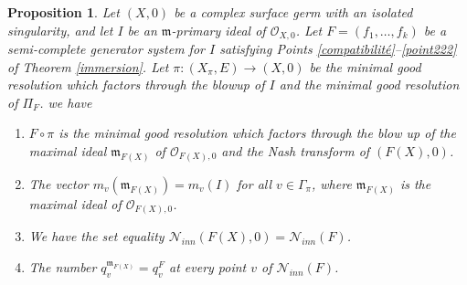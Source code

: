 \documentclass[reqno,dvipsnames,12pt]{amsart}
\newtheorem{prop}[thm]{Proposition}
\begin{document}
\begin{prop}\label{geometricdecompositionarethesame}
  Let $(X,0)$ be a complex surface germ with an isolated singularity, and let $I$ be an $\mathfrak{m}$-primary ideal of $\mathcal{O}_{X,0}$. Let $F=(f_1,\dots,f_k)$ be a semi-complete generator system for $I$ satisfying Points \ref{compatibilité}--\ref{point222} of Theorem \ref{immersion}. Let $\pi:(X_{\pi},E) \longrightarrow (X,0)$ be the minimal good resolution  which factors through the blowup of $I$ and the minimal good resolution of $\Pi_F$.  we have

\begin{enumerate}
	\item  $F \circ \pi$ is the minimal good resolution which factors through the blow up of the maximal ideal $\mathfrak{m}_{F(X)}$ of $\mathcal{O}_{F(X),0}$ and the Nash transform of $(F(X),0)$. \label{merde1}
	\item The vector $m_v(\mathfrak{m}_{F(X)})=m_v(I)$ for all $v \in \Gamma_{\pi}$, where $\mathfrak{m}_{F(X)}$ is the maximal ideal of $\mathcal{O}_{F(X),0}$.\label{merde2}
	\item We have the set equality $\mathcal{N}_{inn}(F(X),0)= \mathcal{N}_{inn}(F)$.\label{merde3}
	\item The number $q_v^{\mathfrak{m}_{F(X)}}=q_v^{F}$ at every point $v$ of 	$\mathcal{N}_{inn}(F)$.	\label{merde4}
    \end{enumerate}

    
\end{prop}
\end{document}
